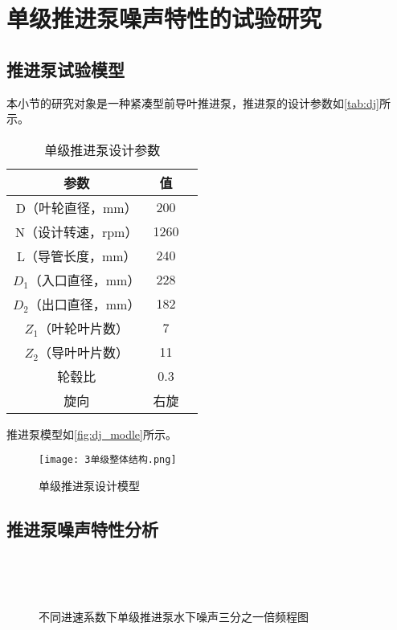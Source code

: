 \section{单级推进泵噪声特性的试验研究}
\subsection{推进泵试验模型}
本小节的研究对象是一种紧凑型前导叶推进泵，推进泵的设计参数如\autoref{tab:dj}所示。
\begin{table}[htbp]
    \centering
    \caption{\label{tab:dj}单级推进泵设计参数}
    \begin{tabular}{ccc}
     \toprule
     参数&值\\
     \midrule
     D（叶轮直径，mm）&200\\
     N（设计转速，rpm）&1260\\
     L（导管长度，mm）&240\\
     $D_1$（入口直径，mm）&228\\
     $D_2$（出口直径，mm）&182\\
     $Z_1$（叶轮叶片数）&7\\
     $Z_2$（导叶叶片数）&11\\
     轮毂比&0.3\\
     旋向&右旋\\
     \bottomrule
    \end{tabular}
\end{table}

推进泵模型如\autoref{fig:dj_modle}所示。
\begin{figure}[htbp]
    \centering
    \texttt{[image: 3单级整体结构.png]}
    \caption{\label{fig:dj_modle}单级推进泵设计模型}
\end{figure}

\subsection{推进泵噪声特性分析}
\begin{figure}[htbp]
        \centering
        \vspace{0.02cm}
        \vspace{0.02cm}
\end{figure}
\addtocounter{figure}{-1}
\begin{figure}[htbp]
        \centering
        \addtocounter{figure}{1} 
        \vspace{0.02cm}
        \caption{\label{fig:dj_modle}不同进速系数下单级推进泵水下噪声三分之一倍频程图}
\end{figure}
